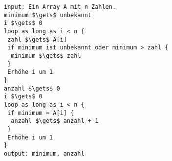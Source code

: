 %
%
\begin{minipage}{\linewidth}
\begin{lstlisting}[language=pseudocode, caption={Algorithmus für das Problem \protect\autoref{problem-anzahl-minima-n-zahlen}}, label={lst-algo-anzahl-minima-n-zahlen}]
input: Ein Array A mit n Zahlen.
minimum $\gets$ unbekannt
i $\gets$ 0
loop as long as i < n {
 zahl $\gets$ A[i]
 if minimum ist unbekannt oder minimum > zahl {
  minimum $\gets$ zahl
 }
 Erhöhe i um 1
}
anzahl $\gets$ 0
i $\gets$ 0
loop as long as i < n {
 if minimum = A[i] {
  anzahl $\gets$ anzahl + 1
 }
 Erhöhe i um 1
}
output: minimum, anzahl
\end{lstlisting}
\end{minipage}
